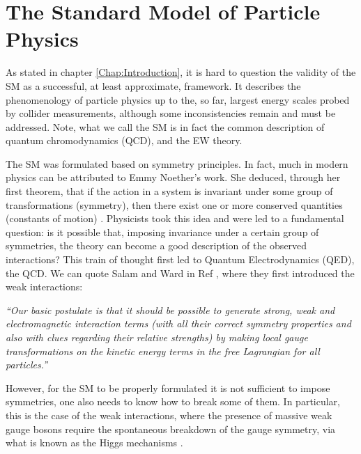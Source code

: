 \documentclass[10pt]{report}
\begin{document}
\chapter{The Standard Model of Particle Physics}
\label{Chap:SM}

\begingroup
\let\clearpage\relax

As stated in chapter \ref{Chap:Introduction}, it is hard to question the validity of the SM as a successful, at least approximate, framework. It describes the phenomenology of particle physics up to the, so far, largest energy scales probed by collider measurements, although some inconsistencies remain and must be addressed. Note, what we call the SM is in fact the common description of quantum chromodynamics (QCD), and the EW theory. 

The SM was formulated based on symmetry principles. In fact, much in modern physics can be attributed to Emmy Noether's work. She deduced, through her first theorem, that if the action in a system is invariant under some group of transformations (symmetry), then there exist one or more conserved quantities (constants of motion) \cite{doi:10.1080/00411457108231446}. Physicists took this idea and were led to a fundamental question: is it possible that, imposing invariance under a certain group of symmetries, the theory can become a good description of the observed interactions? This train of thought first led to Quantum Electrodynamics (QED), the QCD. We can quote Salam and Ward in Ref \cite{Salam1961}, where they first introduced the weak interactions:

\textit{“Our basic postulate is that it should be possible to generate strong,  weak and electromagnetic  interaction terms (with all their correct symmetry properties and also with clues regarding their relative strengths) by making local gauge transformations on the kinetic energy terms in the free Lagrangian for all particles.”}

However, for the SM to be properly formulated it is not sufficient to impose symmetries, one also needs to know how to break some of them. In particular, this is the case of the weak interactions, where the presence of massive weak gauge bosons require the spontaneous breakdown of the gauge symmetry, via what is known as the Higgs mechanisms \cite{higgs1964broken}. 
\end{document}
